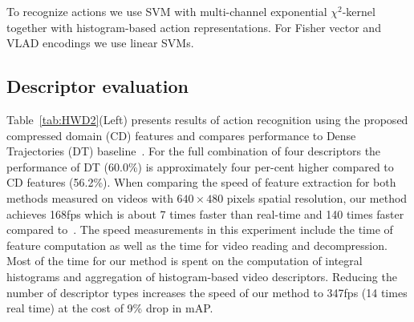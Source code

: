 \documentclass[10pt,twocolumn,letterpaper]{article}
\begin{document}
To recognize actions we use SVM with multi-channel exponential $\chi^2$-kernel~\cite{Zhang07} together with histogram-based action representations. For Fisher vector and VLAD encodings we use linear SVMs.


\subsection{Descriptor evaluation}

Table~\ref{tab:HWD2}(Left) presents results of action recognition using the proposed compressed domain (CD) features %
and compares performance to Dense Trajectories (DT) baseline~\cite{Wang12}. For the full combination of four descriptors the performance of DT (60.0\%) is approximately four per-cent higher compared to CD features (56.2\%). When comparing the speed of feature extraction for both methods measured on videos with $640\times480$ pixels spatial resolution, our method achieves 168fps which is about 7 times faster than real-time and 140 times faster compared to~\cite{Wang12}. The speed measurements in this experiment include the time of feature computation as well as the time for video reading and decompression. Most of the time for our method is spent on the computation of integral histograms and aggregation of histogram-based video descriptors. Reducing the number of descriptor types increases the speed of our method to 347fps (14 times real time) at the cost of 9\% drop in mAP.

\end{document}

